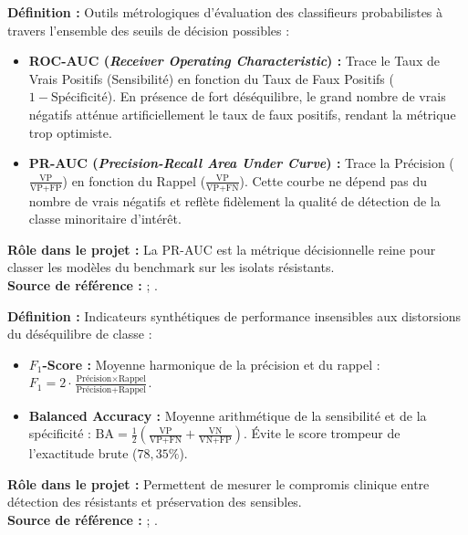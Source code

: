 \documentclass[11pt,a4paper]{article}
\begin{document}
\begin{defbox}
\textbf{Définition :} Outils métrologiques d'évaluation des classifieurs probabilistes à travers l'ensemble des seuils de décision possibles \citep{fawcett2006introduction,davis2006relationship,saito2015precision} :
\begin{itemize}[leftmargin=*, label=$\bullet$]
    \item \textbf{ROC-AUC (\textit{Receiver Operating Characteristic}) :} Trace le Taux de Vrais Positifs (Sensibilité) en fonction du Taux de Faux Positifs ($1 - \text{Spécificité}$). En présence de fort déséquilibre, le grand nombre de vrais négatifs atténue artificiellement le taux de faux positifs, rendant la métrique trop optimiste.
    \item \textbf{PR-AUC (\textit{Precision-Recall Area Under Curve}) :} Trace la Précision ($\frac{\text{VP}}{\text{VP}+\text{FP}}$) en fonction du Rappel ($\frac{\text{VP}}{\text{VP}+\text{FN}}$). Cette courbe ne dépend pas du nombre de vrais négatifs et reflète fidèlement la qualité de détection de la classe minoritaire d'intérêt.
\end{itemize}
\textbf{Rôle dans le projet :} La PR-AUC est la métrique décisionnelle reine pour classer les modèles du benchmark sur les isolats résistants.\\
\textbf{Source de référence :} \citet{davis2006relationship} ; \citet{saito2015precision}.
\end{defbox}

\begin{defbox}
\textbf{Définition :} Indicateurs synthétiques de performance insensibles aux distorsions du déséquilibre de classe \citep{powers2011evaluation,brodersen2010balanced} :
\begin{itemize}[leftmargin=*, label=$\bullet$]
    \item \textbf{$F_1$-Score :} Moyenne harmonique de la précision et du rappel : $F_1 = 2 \cdot \frac{\text{Précision} \times \text{Rappel}}{\text{Précision} + \text{Rappel}}$.
    \item \textbf{Balanced Accuracy :} Moyenne arithmétique de la sensibilité et de la spécificité : $\text{BA} = \frac{1}{2}\left( \frac{\text{VP}}{\text{VP}+\text{FN}} + \frac{\text{VN}}{\text{VN}+\text{FP}} \right)$. Évite le score trompeur de l'exactitude brute ($78,35\%$).
\end{itemize}
\textbf{Rôle dans le projet :} Permettent de mesurer le compromis clinique entre détection des résistants et préservation des sensibles.\\
\textbf{Source de référence :} \citet{powers2011evaluation} ; \citet{brodersen2010balanced}.
\end{defbox}
\end{document}
